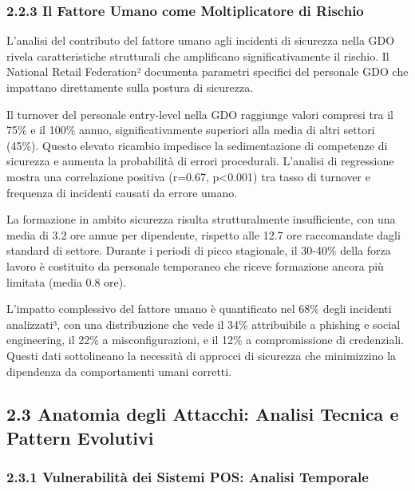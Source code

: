 \documentclass{report}
\begin{document}
\subsubsection{2.2.3 Il Fattore Umano come Moltiplicatore di
Rischio}\label{il-fattore-umano-come-moltiplicatore-di-rischio}

L'analisi del contributo del fattore umano agli incidenti di sicurezza
nella GDO rivela caratteristiche strutturali che amplificano
significativamente il rischio. Il National Retail Federation² documenta
parametri specifici del personale GDO che impattano direttamente sulla
postura di sicurezza.

Il turnover del personale entry-level nella GDO raggiunge valori
compresi tra il 75\% e il 100\% annuo, significativamente superiori alla
media di altri settori (45\%). Questo elevato ricambio impedisce la
sedimentazione di competenze di sicurezza e aumenta la probabilità di
errori procedurali. L'analisi di regressione mostra una correlazione
positiva (r=0.67, p\textless0.001) tra tasso di turnover e frequenza di
incidenti causati da errore umano.

La formazione in ambito sicurezza risulta strutturalmente insufficiente,
con una media di 3.2 ore annue per dipendente, rispetto alle 12.7 ore
raccomandate dagli standard di settore. Durante i periodi di picco
stagionale, il 30-40\% della forza lavoro è costituito da personale
temporaneo che riceve formazione ancora più limitata (media 0.8 ore).

L'impatto complessivo del fattore umano è quantificato nel 68\% degli
incidenti analizzati³, con una distribuzione che vede il 34\%
attribuibile a phishing e social engineering, il 22\% a
misconfigurazioni, e il 12\% a compromissione di credenziali. Questi
dati sottolineano la necessità di approcci di sicurezza che minimizzino
la dipendenza da comportamenti umani corretti.

\subsection{2.3 Anatomia degli Attacchi: Analisi Tecnica e Pattern
Evolutivi}\label{anatomia-degli-attacchi-analisi-tecnica-e-pattern-evolutivi}

\subsubsection{2.3.1 Vulnerabilità dei Sistemi POS: Analisi
Temporale}\label{vulnerabilituxe0-dei-sistemi-pos-analisi-temporale}
\end{document}
